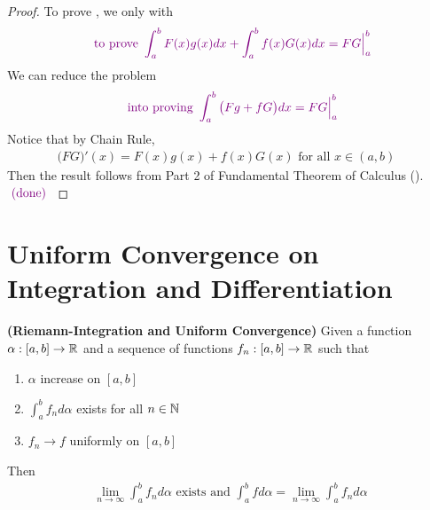 \documentclass{report}
\begin{document}
\begin{proof}
To prove , we only with 
\begin{align*}
\textcolor{violet}{\text{ to prove }\int_a^b F(x)g(x)dx+\int_a^b f(x)G(x)dx=FG\Big|_a^b}
\end{align*}
We can reduce the problem 
\begin{align*}
\textcolor{violet}{\text{ into proving }\int_a^b \big( Fg+fG \big) dx=FG\Big|_a^b}
\end{align*}
Notice that by Chain Rule,  
\begin{align*}
\big(FG \big)'(x)=F(x)g(x)+f(x)G(x)\text{ for all $x \in (a,b)$ }
\end{align*}
Then the result follows from Part 2 of Fundamental Theorem of Calculus (). $\textcolor{violet}{\text{ (done) }}$
\end{proof}
\section{Uniform Convergence on Integration and Differentiation}
\begin{theorem}
\label{RIFac}
\textbf{(Riemann-Integration and Uniform Convergence)} Given a function $\alpha :[a,b]\rightarrow \mathbb{R}$ and a sequence of functions $f_n:[a,b]\rightarrow \mathbb{R}$ such that 
\begin{enumerate}[label=(\alph*)]
  \item $\alpha $ increase on $[a,b]$ 
  \item $\int_a^b f_nd\alpha $ exists for all $n\in\mathbb{N}$ 
  \item $f_n \to f $ uniformly on $[a,b]$ 
\end{enumerate}
Then 
\begin{align*}
  \lim_{n\to \infty}\int_a^b f_n d\alpha \text{ exists and }\int_a^b fd\alpha =\lim_{n\to \infty}\int_a^b f_nd\alpha 
\end{align*}
\end{theorem}
\end{document}
